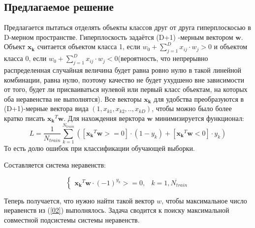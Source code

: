 \documentclass[a4paper]{article}
\newcommand{\w}{\bm{w}}
\newcommand{\yk}{y_k}
\newcommand{\xk}{\bm{x_k}}
\begin{document}
\subsection{Предлагаемое решение}
Предлагается пытаться отделять объекты классов друг от друга гиперплоскосью в D-мерном пространстве. Гиперплоскость задаётся (D+1) -мерным вектором $\w$. Объект $\xk$ считается объектом класса 1, если $w_{0} + \sum_{j = 1}^{D}x_{ij} \cdot w_j > 0$ и объектом класса 0, если $w_{0} + \sum_{j = 1}^{D}x_{ij} \cdot w_j < 0$(вероятность, что непрерывно распределенная случайная величина будет равна ровно нулю в такой линейной комбинации, равна нулю, поэтому качество не будет ухудшено вне зависимости от того, будет ли присваиваться нулевой или первый класс объектам, на которых оба неравенства не выполнятся). Все векторы $\xk$ для удобства преобразуются в (D+1)-мерные вектора вида $(1, x_{k1}, x_{k2}, .., x_{kD})$, чтобы можно было более кратко писать $\xk^{T}\w$. Для нахождения верктора $\w$ минимизируется функционал:
\begin{equation} \label{01}
L = \frac{1}{N_{train}} \sum_{k = 1}^{N_{train}}([\xk^{T}\w >= 0] \cdot (1 - y_k) + [\xk^{T}\w < 0] \cdot y_k)
\end{equation}
То есть долю ошибок при классификации обучающей выборки.

Составляется система неравенств: 

\begin{equation}\label{02}
\begin{cases}
\xk^T\w \cdot (-1) ^ {\yk} >=0, & k = \overline{1,N_{train}} 
\end{cases}
\end{equation}

Теперь получается, что нужно найти такой вектор $w$, чтобы максимальное число неравенств из (\ref{02}) выполнялось. Задача сводится к поиску максимальной совместной подсистемы системы неравенств.
\end{document}
